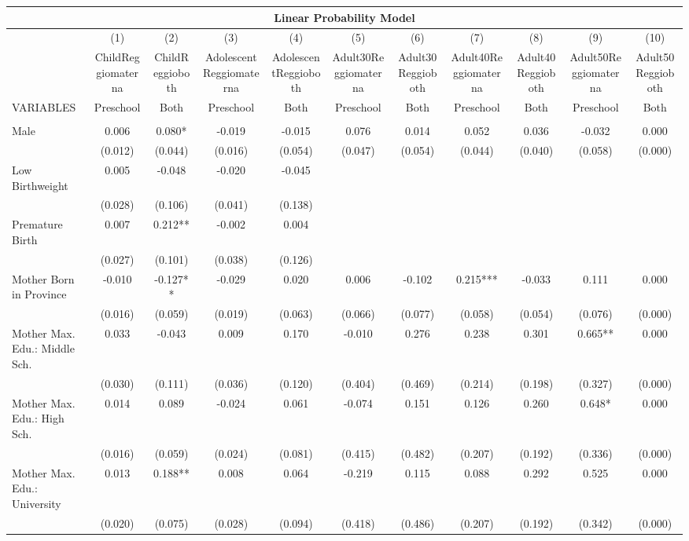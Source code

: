 \begin{tabular}{lcccccccccc}
\multicolumn{11}{c}{Linear Probability Model} \\ \hline
 & (1) & (2) & (3) & (4) & (5) & (6) & (7) & (8) & (9) & (10) \\
 & ChildReggiomaterna & ChildReggioboth & AdolescentReggiomaterna & AdolescentReggioboth & Adult30Reggiomaterna & Adult30Reggioboth & Adult40Reggiomaterna & Adult40Reggioboth & Adult50Reggiomaterna & Adult50Reggioboth \\
VARIABLES & Preschool & Both & Preschool & Both & Preschool & Both & Preschool & Both & Preschool & Both \\ \hline
 &  &  &  &  &  &  &  &  &  &  \\
Male & 0.006 & 0.080* & -0.019 & -0.015 & 0.076 & 0.014 & 0.052 & 0.036 & -0.032 & 0.000 \\
 & (0.012) & (0.044) & (0.016) & (0.054) & (0.047) & (0.054) & (0.044) & (0.040) & (0.058) & (0.000) \\
Low Birthweight & 0.005 & -0.048 & -0.020 & -0.045 &  &  &  &  &  &  \\
 & (0.028) & (0.106) & (0.041) & (0.138) &  &  &  &  &  &  \\
Premature Birth & 0.007 & 0.212** & -0.002 & 0.004 &  &  &  &  &  &  \\
 & (0.027) & (0.101) & (0.038) & (0.126) &  &  &  &  &  &  \\
Mother Born in Province & -0.010 & -0.127** & -0.029 & 0.020 & 0.006 & -0.102 & 0.215*** & -0.033 & 0.111 & 0.000 \\
 & (0.016) & (0.059) & (0.019) & (0.063) & (0.066) & (0.077) & (0.058) & (0.054) & (0.076) & (0.000) \\
Mother Max. Edu.: Middle Sch. & 0.033 & -0.043 & 0.009 & 0.170 & -0.010 & 0.276 & 0.238 & 0.301 & 0.665** & 0.000 \\
 & (0.030) & (0.111) & (0.036) & (0.120) & (0.404) & (0.469) & (0.214) & (0.198) & (0.327) & (0.000) \\
Mother Max. Edu.: High Sch. & 0.014 & 0.089 & -0.024 & 0.061 & -0.074 & 0.151 & 0.126 & 0.260 & 0.648* & 0.000 \\
 & (0.016) & (0.059) & (0.024) & (0.081) & (0.415) & (0.482) & (0.207) & (0.192) & (0.336) & (0.000) \\
Mother Max. Edu.: University & 0.013 & 0.188** & 0.008 & 0.064 & -0.219 & 0.115 & 0.088 & 0.292 & 0.525 & 0.000 \\
 & (0.020) & (0.075) & (0.028) & (0.094) & (0.418) & (0.486) & (0.207) & (0.192) & (0.342) & (0.000) \\

\end{tabular}

